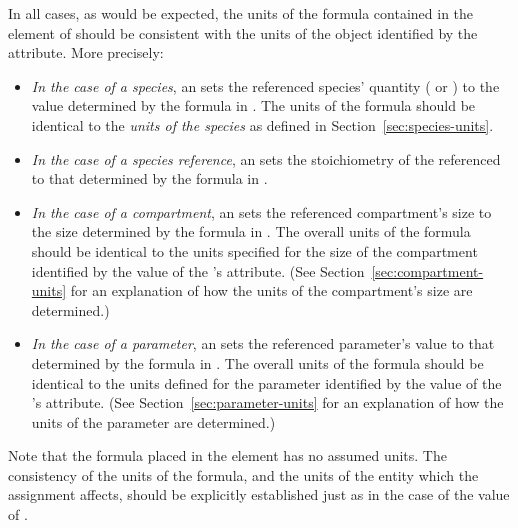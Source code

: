 In all cases, as would be expected, the units of the formula
contained in the  element of
\EventAssignment should be consistent with the units of the object
identified by the  attribute.  More
precisely:
\begin{itemize}
  
\item \emph{In the case of a species}, an \EventAssignment sets
  the referenced species' quantity ( or
  ) to the value determined by the
  formula in .  The units of the  formula
  should be identical to the \emph{units of the species} as defined
  in Section~\ref{sec:species-units}.
  
\item \emph{In the case of a species reference}, an \EventAssignment sets
  the stoichiometry of the referenced \SpeciesReference to that determined by the
  formula in . 

\item \emph{In the case of a compartment}, an \EventAssignment
  sets the referenced compartment's size to the size determined by
  the formula in .  The overall units of the formula
  should be identical to the units specified for the size of the
  compartment identified by the value of the \EventAssignment's
   attribute.  (See
  Section~\ref{sec:compartment-units} for an explanation of how
  the units of the compartment's size are determined.)
  
\item \emph{In the case of a parameter}, an \EventAssignment sets
  the referenced parameter's value to that determined by the
  formula in .  The overall units of the formula should
  be identical to the units defined for the parameter identified
  by the value of the \EventAssignment's 
  attribute.  (See Section~\ref{sec:parameter-units} for
  an explanation of how the units of the parameter are
  determined.)

\end{itemize}



Note that the formula placed in the  element
has no assumed units.  The consistency of the units of the
formula, and the units of the entity which the assignment affects,
should be explicitly established just as in the case of the value of
.





